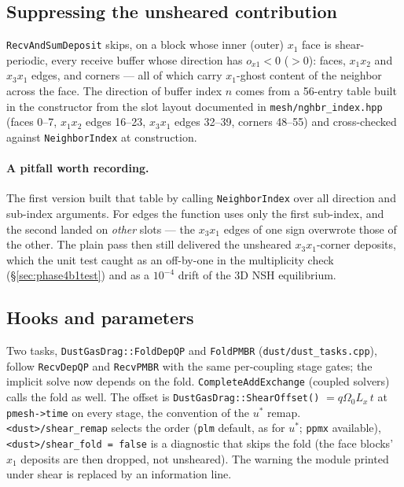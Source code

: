 \documentclass[11pt]{article}
\newcommand{\code}[1]{\texttt{#1}}
\newcommand{\file}[1]{\texttt{\small #1}}
\newcommand{\fn}[1]{\texttt{\small #1}}
\newcommand{\Om}{\Omega_0}
\newcommand{\qom}{q\Om}
\begin{document}
\subsection{Suppressing the unsheared contribution}

\fn{RecvAndSumDeposit} skips, on a block whose inner (outer) $x_1$ face is
shear-periodic, every receive buffer whose direction has $o_{x1} < 0$ ($> 0$): faces,
$x_1x_2$ and $x_3x_1$ edges, and corners --- all of which carry $x_1$-ghost content of
the neighbor across the face. The direction of buffer index $n$ comes from a 56-entry
table built in the constructor from the slot layout documented in
\file{mesh/nghbr\_index.hpp} (faces 0--7, $x_1x_2$ edges 16--23, $x_3x_1$ edges 32--39,
corners 48--55) and cross-checked against \fn{NeighborIndex} at construction.

\paragraph{A pitfall worth recording.} The first version built that table by calling
\fn{NeighborIndex} over all direction and sub-index arguments. For edges the function
uses only the first sub-index, and the second landed on \emph{other} slots --- the
$x_3x_1$ edges of one sign overwrote those of the other. The plain pass then still
delivered the unsheared $x_3x_1$-corner deposits, which the unit test caught as an
off-by-one in the multiplicity check (\S\ref{sec:phase4b1test}) and as a $10^{-4}$ drift
of the 3D NSH equilibrium.

\subsection{Hooks and parameters}

Two tasks, \fn{DustGasDrag::FoldDepQP} and \fn{FoldPMBR} (\file{dust/dust\_tasks.cpp}),
follow \fn{RecvDepQP} and \fn{RecvPMBR} with the same per-coupling stage gates; the
implicit solve now depends on the fold. \fn{CompleteAddExchange} (coupled solvers) calls
the fold as well. The offset is \fn{DustGasDrag::ShearOffset()} $= \qom L_x\,t$ at
\code{pmesh->time} on every stage, the convention of the $u^\ast$ remap.
\code{<dust>/shear\_remap} selects the order (\code{plm} default, as for $u^\ast$;
\code{ppmx} available), \code{<dust>/shear\_fold = false} is a diagnostic that skips the
fold (the face blocks' $x_1$ deposits are then dropped, not unsheared). The warning the
module printed under shear is replaced by an information line.
\end{document}

